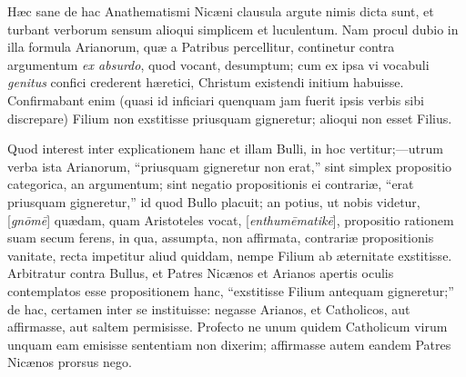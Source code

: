 Hæc sane
de hac Anathematismi Nicæni clausula argute nimis dicta sunt, et
turbant verborum sensum alioqui simplicem et luculentum. Nam procul
dubio in illa formula Arianorum, quæ a Patribus percellitur,
continetur contra argumentum \emph{ex absurdo}, quod vocant, desumptum;
cum ex ipsa vi vocabuli \emph{genitus} confici crederent hæretici,
Christum existendi initium habuisse. Confirmabant enim (quasi id
inficiari quenquam jam fuerit ipsis verbis sibi discrepare) Filium non
exstitisse priusquam gigneretur; alioqui non esset Filius.

Quod
interest inter explicationem hanc et illam Bulli, in hoc vertitur;—utrum
verba ista Arianorum, ``priusquam gigneretur non erat,'' sint
simplex propositio categorica, an argumentum; sint negatio
propositionis ei contrariæ, ``erat priusquam gigneretur,'' id quod
Bullo placuit; an potius, ut nobis videtur, [\emph{gn\={o}m\={e}}]
quædam, quam Aristoteles vocat, [\emph{enthum\={e}matik\={e}}],
propositio rationem suam secum ferens, in qua, assumpta, non affirmata,
contrariæ propositionis vanitate, recta impetitur aliud quiddam,
nempe Filium ab æternitate exstitisse. Arbitratur contra Bullus, et
Patres Nicænos et Arianos apertis oculis contemplatos esse
propositionem hanc, ``exstitisse Filium antequam gigneretur;'' de
hac, certamen inter se instituisse: negasse Arianos, et Catholicos, aut
affirmasse, aut saltem permisisse. Profecto ne unum quidem Catholicum
virum unquam eam emisisse sententiam non dixerim; affirmasse autem
eandem Patres Nicænos prorsus nego.

